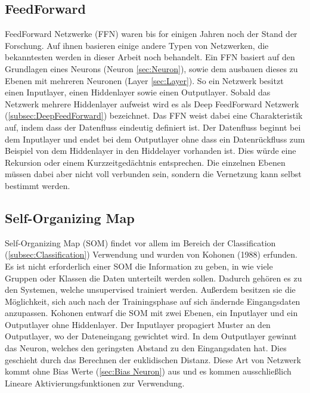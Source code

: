 \subsection{FeedForward}
\label{subsec:FeedForward}

FeedForward Netzwerke (FFN) waren bis for einigen Jahren noch der Stand der Forschung.
Auf ihnen basieren einige andere Typen von Netzwerken, die bekanntesten werden in dieser Arbeit noch behandelt.
Ein FFN basiert auf den Grundlagen eines Neurons (Neuron \ref{sec:Neuron}), sowie dem ausbauen dieses zu Ebenen mit mehreren Neuronen (Layer \ref{sec:Layer}).
So ein Netzwerk besitzt einen Inputlayer, einen Hiddenlayer sowie einen Outputlayer.
Sobald das Netzwerk mehrere Hiddenlayer aufweist wird es als Deep FeedForward Netzwerk (\ref{subsec:DeepFeedForward}) bezeichnet.
Das FFN weist dabei eine Charakteristik auf, indem dass der Datenfluss eindeutig definiert ist. 
Der Datenfluss beginnt bei dem Inputlayer und endet bei dem Outputlayer ohne dass ein Datenrückfluss zum Beispiel von dem Hiddenlayer in den Hiddelayer vorhanden ist.
Dies würde eine Rekursion oder einem Kurzzeitgedächtnis entsprechen.
Die einzelnen Ebenen müssen dabei aber nicht voll verbunden sein, sondern die Vernetzung kann selbst bestimmt werden.

\subsection{Self-Organizing Map}
\label{subsec:SelfOrganizingMap}

Self-Organizing Map (SOM) findet vor allem im Bereich der Classification (\ref{subsec:Classification}) Verwendung und wurden von Kohonen (1988) erfunden. 
Es ist nicht erforderlich einer SOM die Information zu geben, in wie viele Gruppen oder Klassen die Daten unterteilt werden sollen. 
Dadurch gehören es zu den Systemen, welche unsupervised trainiert werden. 
Außerdem besitzen sie die Möglichkeit, sich auch nach der Trainingsphase auf sich ändernde Eingangsdaten anzupassen. 
Kohonen entwarf die SOM mit zwei Ebenen, ein Inputlayer und ein Outputlayer ohne Hiddenlayer. 
Der Inputlayer propagiert Muster an den Outputlayer, wo der Dateneingang gewichtet wird. 
In dem Outputlayer gewinnt das Neuron, welches den geringsten Abstand zu den Eingangsdaten hat.
Dies geschieht durch das Berechnen der euklidischen Distanz. 
Diese Art von Netzwerk kommt ohne Bias Werte (\ref{sec:Bias Neuron}) aus und es kommen ausschließlich Lineare Aktivierungsfunktionen zur Verwendung.


